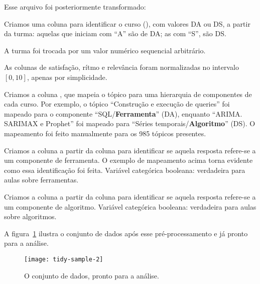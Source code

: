Esse arquivo foi posteriormente transformado:
\begin{compactitem}
	\item Criamos uma coluna para identificar o curso (), com valores DA ou DS, a partir da turma: aquelas que iniciam com ``A'' são de DA; as com ``S'', são DS.
	
	\item A turma foi trocada por um valor numérico sequencial arbitrário.
	
	\item As colunas de satisfação, rítmo e relevância foram normalizadas no intervalo $[0,10]$, apenas por simplicidade.

	\item Criamos a coluna , que mapeia o tópico para uma hierarquia  de componentes de cada curso.
	Por exemplo, o tópico ``Construção e execução de queries'' foi mapeado para o componente ``SQL/\textbf{Ferramenta}'' (DA), enquanto ``ARIMA. SARIMAX e Prophet'' foi mapeado para ``Séries temporais/\textbf{Algoritmo}'' (DS).
	O mapeamento foi feito manualmente para os 985 tópicos presentes.

	\item Criamos a coluna  a partir da coluna  para identificar se aquela resposta refere-se a um componente de ferramenta.
	O exemplo de mapeamento acima torna evidente como essa identificação foi feita.
	Variável categórica booleana: verdadeira para aulas sobre ferramentas.
	
	\item Criamos a coluna  a partir da coluna  para identificar se aquela resposta refere-se a um componente de algoritmo.
	Variável categórica booleana: verdadeira para aulas sobre algoritmos.
\end{compactitem}

A figura~\ref{fig:dataset} ilustra o conjunto de dados após esse pré-processamento e já pronto para a análise.

\begin{figure}
	\centering
	\texttt{[image: tidy-sample-2]}
	\caption{O conjunto de dados, pronto para a análise.}
	\label{fig:dataset}
\end{figure}